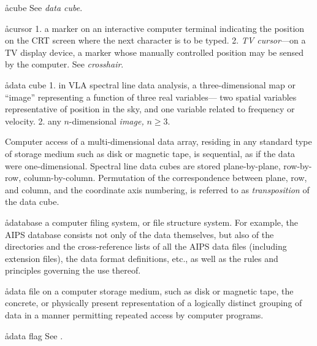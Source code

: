 \aa{cube} See {\it data cube}.

\aa{cursor}
1. a marker on an interactive computer terminal indicating
the position on the CRT screen where the next character is to be typed.
\xspace2. {\it TV cursor}---on a TV display device, a marker
whose manually controlled position may be sensed by the computer.
See {\it crosshair}.

\aa{data cube}
1. in VLA spectral line data analysis, a three-dimensional map or ``image''
representing a function of three real variables---%
two spatial variables representative of position in the sky,
and one variable related to frequency or velocity.
\xspace2. any $n$-dimensional {\it image,} $n\ge3$.
\par
Computer access of a multi-dimensional data array,
residing in any standard type of storage medium such as
disk or magnetic tape,
is sequential, as if the data were one-dimensional.
Spectral line data cubes are stored plane-by-plane,
row-by-row, column-by-column.
Permutation of the correspondence between plane, row, and column,
and the coordinate axis numbering, is referred to as {\it transposition}
of the data cube.

\aa{database}
a computer filing system, or file structure system.
For example, the AIPS database consists not only of the
data themselves, but also of the directories and the cross-reference
lists of all the AIPS data files (including extension files),
the data format definitions, etc.,
as well as the rules and principles governing the use thereof.

\aa{data file}
on a computer storage medium, such as disk or magnetic tape,
the concrete, or physically present representation
of a logically distinct grouping of data
in a manner permitting repeated access by
computer programs.

\aa{data flag}
See .

